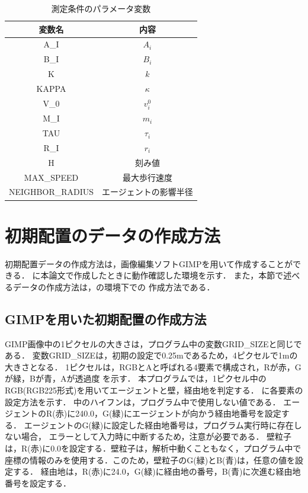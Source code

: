 \begin{table}[t]
  \begin{center}
    \caption{測定条件のパラメータ変数}
    \label{tb:parameter_settings}
    \begin{tabular}{c|c}
      \hline \hline
      変数名 & 内容 \\ \hline
      A\_I & $A_i$ \\ \hline
      B\_I & $B_i$ \\ \hline 
      K   & $k$   \\ \hline 
      KAPPA & $\kappa$  \\ \hline 
      V\_0 & $v_i^0$     \\ \hline 
      M\_I & $m_i$       \\ \hline 
      TAU & $\tau_i$    \\ \hline 
      R\_I & $r_i$       \\ \hline 
      H   & 刻み値 \\ \hline
      MAX\_SPEED & 最大歩行速度 \\ \hline
      NEIGHBOR\_RADIUS & エージェントの影響半径 \\ \hline

    \end{tabular}
  \end{center}
\end{table}

\section{初期配置のデータの作成方法}
初期配置データの作成方法は，画像編集ソフトGIMPを用いて作成することができる．
に本論文で作成したときに動作確認した環境を示す．
また，本節で述べるデータの作成方法は，の環境下での
作成方法である．

\subsection{GIMPを用いた初期配置の作成方法}
GIMP画像中の1ピクセルの大きさは，プログラム中の変数GRID\_SIZEと同じである．
変数GRID\_SIZEは，初期の設定で0.25mであるため，4ピクセルで1mの大きさとなる．
1ピクセルは，RGBとAと呼ばれる4要素で構成され，Rが赤，Gが緑，Bが青，Aが透過度
を示す．
本プログラムでは，1ピクセル中のRGB(RGB225形式)を用いてエージェントと壁，経由地を判定する．
に各要素の設定方法を示す．
中のハイフンは，プログラム中で使用しない値である．
エージェントのR(赤)に240.0，G(緑)にエージェントが向かう経由地番号を設定する．
エージェントのG(緑)に設定した経由地番号は，プログラム実行時に存在しない場合，
エラーとして入力時に中断するため，注意が必要である．
壁粒子は，R(赤)に0.0を設定する．壁粒子は，解析中動くこともなく，プログラム中で
座標の情報のみを使用する．このため，壁粒子のG(緑)とB(青)は，任意の値を設定する．
経由地は，R(赤)に24.0，G(緑)に経由地の番号，B(青)に次進む経由地番号を設定する．


